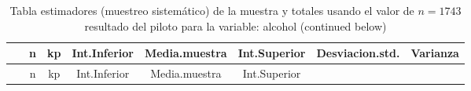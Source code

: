 \documentclass[
]{article}
\begin{document}
\begin{longtable}[]{@{}cccccccc@{}}
\caption{Tabla estimadores (muestreo sistemático) de la muestra y
totales usando el valor de \(n = 1743\) resultado del piloto para la
variable: alcohol (continued below)}\tabularnewline
\toprule
\begin{minipage}[b]{0.18\columnwidth}\centering
~\strut
\end{minipage} & \begin{minipage}[b]{0.05\columnwidth}\centering
n\strut
\end{minipage} & \begin{minipage}[b]{0.03\columnwidth}\centering
kp\strut
\end{minipage} & \begin{minipage}[b]{0.10\columnwidth}\centering
Int.Inferior\strut
\end{minipage} & \begin{minipage}[b]{0.11\columnwidth}\centering
Media.muestra\strut
\end{minipage} & \begin{minipage}[b]{0.10\columnwidth}\centering
Int.Superior\strut
\end{minipage} & \begin{minipage}[b]{0.12\columnwidth}\centering
Desviacion.std.\strut
\end{minipage} & \begin{minipage}[b]{0.08\columnwidth}\centering
Varianza\strut
\end{minipage}\tabularnewline
\midrule
\endfirsthead
\toprule
\begin{minipage}[b]{0.18\columnwidth}\centering
~\strut
\end{minipage} & \begin{minipage}[b]{0.05\columnwidth}\centering
n\strut
\end{minipage} & \begin{minipage}[b]{0.03\columnwidth}\centering
kp\strut
\end{minipage} & \begin{minipage}[b]{0.10\columnwidth}\centering
Int.Inferior\strut
\end{minipage} & \begin{minipage}[b]{0.11\columnwidth}\centering
Media.muestra\strut
\end{minipage} & \begin{minipage}[b]{0.10\columnwidth}\centering
Int.Superior\strut
\end{minipage} & \begin{minipage}[b]{0.12\columnwidth}\centering

\end{minipage}
\end{longtable}
\end{document}
